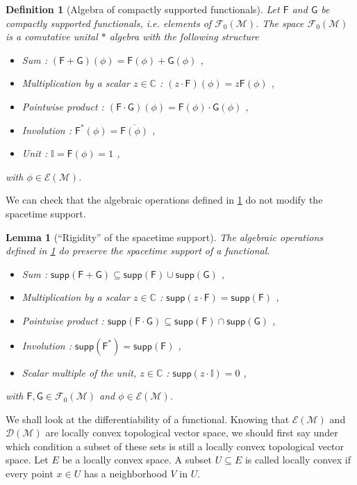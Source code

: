 \documentclass[10pt]{book}
\newcommand{\supp}{\mathsf{supp}}
\newcommand{\Dcal}{\mathcal{D}}
\newcommand{\Ecal}{\mathcal{E}}
\newcommand{\Fcal}{\mathcal{F}}
\newcommand{\Mcal}{\mathcal{M}}
\newcommand{\Cbb}{\mathbb{C}}
\newcommand{\Ibb}{\mathbb{I}}
\newcommand{\Fsf}{\mathsf{F}}
\newcommand{\Gsf}{\mathsf{G}}
\theoremstyle{break}
\newtheorem{lemma}{Lemma}
\newtheorem{definition}{Definition}
\begin{document}
\begin{definition}[Algebra of compactly supported functionals] \label{def:algebra_comp_supp_func}
Let $\Fsf$ and $\Gsf$ be compactly supported functionals, i.e. elements of $\Fcal_0(\Mcal)$. The space $\Fcal_0(\Mcal)$ is a comutative unital $\ast$ algebra with the following structure
%
\begin{itemize}
\item Sum : $(\Fsf+\Gsf)(\phi) = \Fsf(\phi) + \Gsf(\phi)$ ,
\item Multiplication by a scalar $z\in\Cbb$ : $(z \cdot \Fsf)(\phi) = z \Fsf(\phi)$ ,
\item Pointwise product : $(\Fsf \cdot \Gsf)(\phi) = \Fsf(\phi) \cdot \Gsf(\phi)$ ,
\item Involution : $\Fsf^\ast(\phi) = \overline{\Fsf(\phi)}$ ,
\item Unit : $\Ibb = \Fsf(\phi) = 1$ ,
\end{itemize}
%
with $\phi \in \Ecal(\Mcal)$.
\end{definition}


We can check that the algebraic operations defined in \ref{def:algebra_comp_supp_func} do not modify the spacetime support.


\begin{lemma}[``Rigidity'' of the spacetime support]
The algebraic operations defined in \ref{def:algebra_comp_supp_func} do preserve the spacetime support of a functional. 
%
\begin{itemize}
\item Sum : $\supp(\Fsf + \Gsf) \subseteq \supp(\Fsf) \cup \supp(\Gsf)$ ,
\item Multiplication by a scalar $z\in\Cbb$ : $\supp(z\cdot\Fsf) = \supp(\Fsf)$ ,
\item Pointwise product : $\supp(\Fsf \cdot \Gsf) \subseteq \supp(\Fsf) \cap \supp(\Gsf)$ ,
\item Involution : $\supp(\Fsf^\ast) = \supp(\Fsf)$ ,
\item Scalar multiple of the unit, $z\in\Cbb$ : $\supp(z\cdot\Ibb) = 0 $ ,
\end{itemize}
%
with $\Fsf, \Gsf \in \Fcal_0(\Mcal)$ and $\phi \in \Ecal(\Mcal)$.
\end{lemma}


We shall look at the differentiability of a functional. Knowing that $\Ecal(\Mcal)$ and $\Dcal(\Mcal)$ are locally convex topological vector space, we should first say under which condition a subset of these sets is still a locally convex topological vector space. Let $E$ be a locally convex space. A subset $U \subseteq E$ is called locally convex if every point $x \in U$ has a neighborhood $V$ in $U$. 
\end{document}
